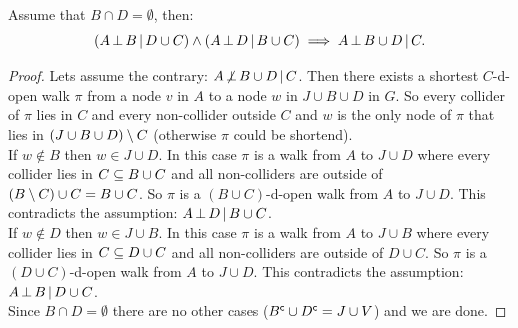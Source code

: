 \begin{Lem} Assume that $B \cap D = \emptyset$, then:
    \[ (A \operatorname*{\perp}  B \operatorname*{|} D \cup  C) \land (A \operatorname*{\perp}  D \operatorname*{|} B \cup C) \implies A  \operatorname*{\perp}  B \cup D \operatorname*{|}   C.\]
\begin{proof}
    Lets assume the contrary:  $A \operatorname*{\not\perp}  B \cup D \operatorname*{|} C$.
    Then there exists a shortest $C$-d-open walk $\pi$ 
    from a node $v$ in $A$ to a node $w$ in $J \cup B \cup D $ in $G$.
    So every collider of $\pi$ lies in $C$ and every non-collider outside $C$ and $w$ is 
    the only node of $\pi$ that lies in $(J \cup B \cup D) \setminus C$ (otherwise $\pi$ could be shortend). \\
    If $w \notin B$ then $w \in J \cup D$. In this case $\pi$ is a walk from $A$ to $J \cup D$ where every collider lies in
    $C \subseteq B \cup C$ and all non-colliders are outside of $(B\setminus C) \cup C = B \cup C$. 
    So $\pi$ is a $(B \cup C)$-d-open walk from $A$ to $J \cup D$.
    This contradicts the assumption: $A \operatorname*{\perp}  D \operatorname*{|} B \cup C$.\\
    If $w \notin D$ then $w \in J \cup B$. In this case $\pi$ is a walk from $A$ to $J \cup B$ where every collider lies in
    $C \subseteq D \cup C$ and all non-colliders are outside of $D \cup C$. 
    So $\pi$ is a $(D \cup C)$-d-open walk from $A$ to $J \cup D$.
    This contradicts the assumption: $A \operatorname*{\perp}  B \operatorname*{|} D \cup  C$.\\
    Since $B \cap D = \emptyset$ there are no other cases ($B^{\mathsf{c}} \cup D^{\mathsf{c}} = J \cup V$) and we are done.
\end{proof}
\end{Lem}

